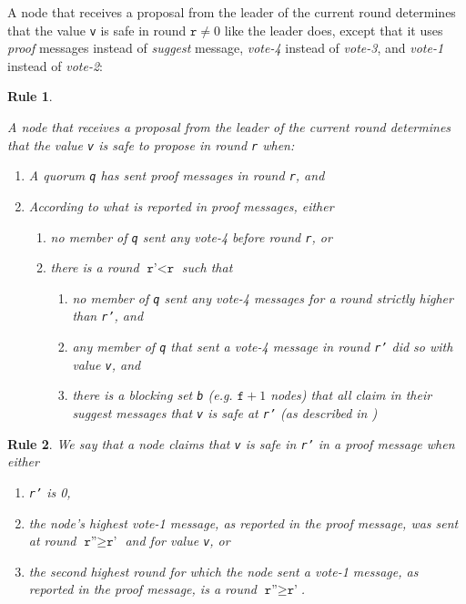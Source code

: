 \documentclass[11pt]{article}
\newtheorem{rrule}{Rule}
\begin{document}
A node that receives a proposal from the leader of the current round determines
that the value \texttt{v} is safe in round $\texttt{r}\neq 0$ like the
leader does, except that it uses \textit{proof} messages instead of
\textit{suggest} message, \textit{vote-4} instead of \textit{vote-3}, and
\textit{vote-1} instead of \textit{vote-2}:

\begin{rrule}
\label{rule:checking-safe-proposal}

A node that receives a proposal from the leader of the current round determines
that the value \texttt{v} is safe to propose in round
\texttt{r} when:
\begin{enumerate}
  \item A quorum \texttt{q} has sent \textit{proof} messages in round \texttt{r}, and
  \item According to what is reported in \textit{proof} messages, either
    \begin{enumerate}
      \item no member of \texttt{q} sent any \textit{vote-4} before round
        \texttt{r}, or
        \label{case:no_votes}
      \item there is a round $\texttt{r'}< \texttt{r}$ such that
        \label{case:highest_vote}
        \begin{enumerate}
          \item no member of \texttt{q} sent any \textit{vote-4} messages for a
            round strictly higher than \texttt{r'}, and
          \item any member of \texttt{q} that sent a \textit{vote-4} message in
            round \texttt{r'} did so with value \texttt{v}, and
          \item there is a blocking set \texttt{b} (e.g. $ \texttt{f} +1$
            nodes) that all claim in their \textit{suggest} messages that
            \texttt{v} is safe at \texttt{r'} (as described in )
        \end{enumerate}
    \end{enumerate}
\end{enumerate}
\end{rrule}

\begin{rrule}
  \label{rule:claims_safe}
We say that a node claims that \texttt{v} is safe in \texttt{r'} in a
\textit{proof} message when either
\begin{enumerate}
  \item \texttt{r'} is 0,
  \item the node's highest \textit{vote-1} message, as reported in the
    \textit{proof} message, was sent at round $\texttt{r''}\geq \texttt{r'}$
    and for value \texttt{v}, or
  \item the second highest round for which the node sent a \textit{vote-1}
    message, as reported in the proof message, is a round $\texttt{r''}\geq
    \texttt{r'}$.
\end{enumerate}
\end{rrule}
\end{document}
